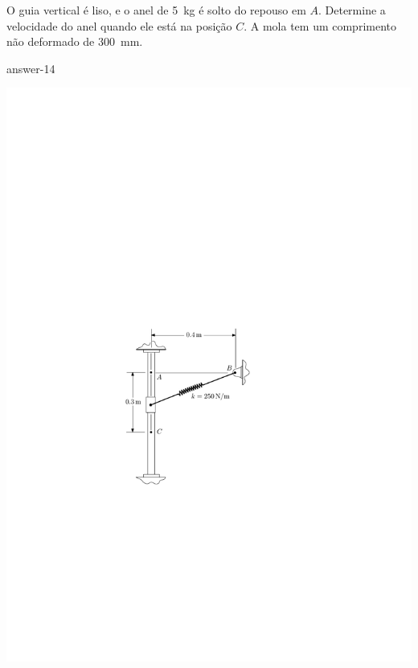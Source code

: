 
\item O guia vertical é liso, e o anel de \SI{5}{\kilogram} é solto do repouso em $A$. Determine a velocidade do anel quando ele está na posição $C$. A mola tem um comprimento não deformado de \SI{300}{\milli\meter}.

{answer-14}

\begin{flushleft}
    \includegraphics[scale=1.4]{images/draw_14.pdf}
\end{flushleft}